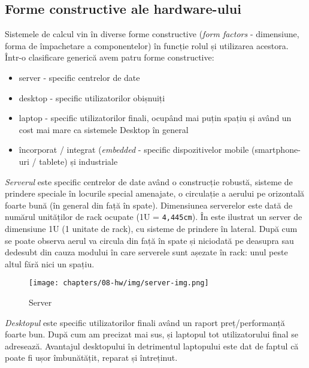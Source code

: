 \subsection{Forme constructive ale hardware-ului}
\label{sec:hw:class:form}

Sistemele de calcul vin în diverse forme constructive (\textit{form factors}
- dimensiune, forma de împachetare a componentelor) în funcție
rolul și utilizarea acestora. Într-o clasificare generică avem
patru forme constructive:
\begin{itemize}
  \item server - specific centrelor de date
  \item desktop - specific utilizatorilor obișnuiți
  \item laptop - specific utilizatorilor finali, ocupând mai puțin spațiu
          și având un cost mai mare ca sistemele Desktop în general
  \item încorporat / integrat (\textit{embedded} - specific dispozitivelor mobile (smartphone-uri /
          tablete) și industriale
\end{itemize}

\textit{Serverul} este specific centrelor de date având o construcție robustă,
sisteme de prindere speciale în locurile special amenajate, o circulație a
aerului pe orizontală foarte bună (în general din față în spate). Dimensiunea
serverelor este dată de numărul unităților de rack ocupate (1U = \texttt{4,445cm}). În
 este ilustrat un server de dimensiune 1U
(1 unitate de rack), cu sisteme de prindere în lateral. După cum se poate
observa aerul va circula din față în spate și niciodată pe deasupra sau dedesubt
din cauza modului în care serverele sunt așezate în rack: unul peste altul fără
nici un spațiu.

\begin{figure}[!htbp]
  \centering
  \texttt{[image: chapters/08-hw/img/server-img.png]}
  \caption{Server\protect\footnotemark}
  \label{fig:hw:server}
\end{figure}

\textit{Desktopul} este specific utilizatorilor finali având un raport
preț/performanță foarte bun. După cum am precizat mai sus, și laptopul tot
utilizatorului final se adresează. Avantajul desktopului în detrimentul
laptopului este dat de faptul că poate fi ușor îmbunătățit, reparat și
întreținut.

